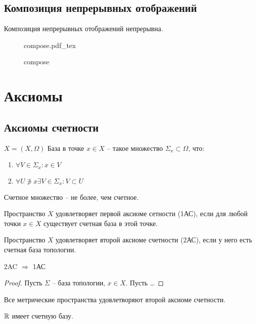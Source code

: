 \documentclass[12pt]{report}
\newcommand{\incfig}[1]{%
    \def\svgwidth{\columnwidth}
    {#1.pdf_tex}
}
\begin{document}
\subsection{Композиция непрерывных отображений}
\begin{thm}
    Композиция непрерывных отображений непрерывна.
\begin{figure}[ht]
    \centering
    \incfig{compose}
    \caption{compose}
    \label{fig:compose}
\end{figure}
\end{thm}
\section{Аксиомы}
\subsection{Аксиомы счетности}
\begin{defn}
    $ X = (X , \Omega )$  
    База в точке $ x \in  X$ -- такое множество $ \Sigma _x \subset \Omega $, что:
    \begin{enumerate}
        \item $ \forall V \in  \Sigma _x: x \in  V$
	\item $ \forall U \not\ni x \exists V \in  \Sigma _x: V \subset U$
    \end{enumerate}
    
\end{defn}
\begin{name}
    Счетное множество -- не более, чем счетное.
\end{name}
\begin{defn}
    Пространство $ X$ удовлетворяет первой аксиоме сетности (1АС), если для любой точки $ x \in  X$ существует счетная база в этой точке.
\end{defn}
\begin{defn}
    Пространство $ X$ удовлетворяет второй аксиоме счетности (2АС), если у него есть счетная база топологии.
\end{defn}
\begin{thm}
    2AC  $ \Rightarrow $ 1АС
\end{thm}
\begin{proof}
    Пусть $  \Sigma  $ -- база топологии, $ x \in X$. Пусть \ldots 
\end{proof}
\begin{thm}
    Все метрические пространства удовлетворяют второй аксиоме счетности.
\end{thm}
\begin{st}
    $ \mathbb{R}$ имеет счетную базу.
\end{st}
\end{document}
